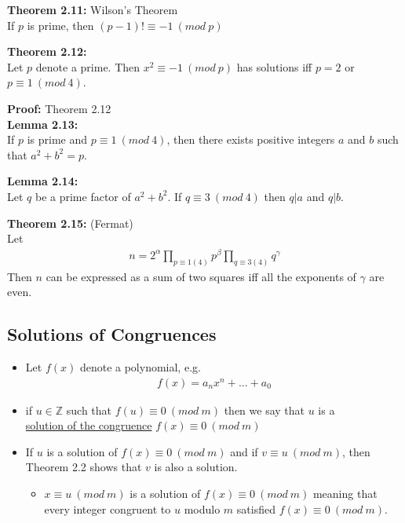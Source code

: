 \documentclass[a4paper]{article}
\begin{document}
\textbf{Theorem 2.11:} Wilson's Theorem\\
If $p$ is prime, then $(p-1)!\equiv -1\ (mod\ p)$

\textbf{Theorem 2.12:}\\
Let $p$ denote a prime. Then $x^2\equiv -1\ (mod\ p)$ has solutions iff $p=2$ or $p\equiv 1\ (mod\ 4)$.


\textbf{Proof:} Theorem 2.12\\

\textbf{Lemma 2.13:}\\
If $p$ is prime and $p\equiv 1\ (mod\ 4)$, then there exists positive integers
$a$ and $b$ such that $a^2+b^2=p$.


\textbf{Lemma 2.14:}\\
Let $q$ be a prime factor of $a^2+b^2$. If $q\equiv 3\ (mod\ 4)$ then $q|a$ and $q|b$.


\textbf{Theorem 2.15:} (Fermat)\\
Let
\begin{align}
    n =  2^\alpha\prod_{p\equiv 1(4)}p^\beta\prod_{q\equiv 3(4)}q^\gamma
\end{align}
Then $n$ can be expressed as a sum of two squares iff all the exponents of $\gamma$ are even.

\subsection{Solutions of Congruences}
\begin{itemize}
    \item Let $f(x)$ denote a polynomial, e.g.
    \begin{align}
        f(x)=a_nx^n+...+a_0
    \end{align}
    \item if $u\in\mathbb{Z}$ such that $f(u)\equiv0\ (mod\ m)$ then we say that $u$ is a\\ \underline{solution of the congruence} $f(x)\equiv0\ (mod\ m)$
    \item If $u$ is a solution of $f(x)\equiv0\ (mod\ m)$ and if $v\equiv u\ (mod\ m)$, then Theorem 2.2 shows that $v$ is also a solution.
    \begin{itemize}
        \item $x\equiv u\ (mod\ m)$ is a solution of $f(x)\equiv0\ (mod\ m)$ meaning that every integer congruent to $u$ modulo $m$ satisfied $f(x)\equiv0\ (mod\ m)$.
    \end{itemize}
\end{itemize}
\end{document}
